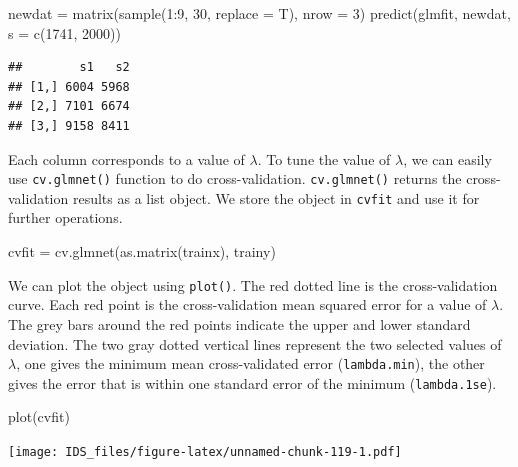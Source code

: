 \documentclass[
  12pt,
]{krantz}
\makeatletter
\newenvironment{Shaded}{\begin{snugshade}}{\end{snugshade}}
\newcommand{\AttributeTok}[1]{\textcolor[rgb]{0.61,0.61,0.61}{#1}}
\newcommand{\DecValTok}[1]{\textcolor[rgb]{0.06,0.06,0.06}{#1}}
\newcommand{\FunctionTok}[1]{\textcolor[rgb]{0,0,0}{#1}}
\newcommand{\NormalTok}[1]{#1}
\newcommand{\OtherTok}[1]{\textcolor[rgb]{0.37,0.37,0.37}{#1}}
\newcommand{\SpecialCharTok}[1]{\textcolor[rgb]{0,0,0}{#1}}
\newenvironment{kframe}{%
\medskip{}
\setlength{\fboxsep}{.8em}
 \def\at@end@of@kframe{}%
 \ifinner\ifhmode%
  \def\at@end@of@kframe{\end{minipage}}%
  \begin{minipage}{\columnwidth}%
 \fi\fi%
 \def\FrameCommand##1{\hskip\@totalleftmargin \hskip-\fboxsep
 \colorbox{shadecolor}{##1}\hskip-\fboxsep
     \hskip-\linewidth \hskip-\@totalleftmargin \hskip\columnwidth}%
 \MakeFramed {\advance\hsize-\width
   \@totalleftmargin\z@ \linewidth\hsize
   \@setminipage}}%
 {\par\unskip\endMakeFramed%
 \at@end@of@kframe}
\renewenvironment{Shaded}{\begin{kframe}}{\end{kframe}}
\makeatother
\begin{document}
\begin{Shaded}
\begin{Highlighting}[]
\NormalTok{newdat }\OtherTok{=} \FunctionTok{matrix}\NormalTok{(}\FunctionTok{sample}\NormalTok{(}\DecValTok{1}\SpecialCharTok{:}\DecValTok{9}\NormalTok{, }\DecValTok{30}\NormalTok{, }\AttributeTok{replace =}\NormalTok{ T), }\AttributeTok{nrow =} \DecValTok{3}\NormalTok{)}
\FunctionTok{predict}\NormalTok{(glmfit, newdat, }\AttributeTok{s =} \FunctionTok{c}\NormalTok{(}\DecValTok{1741}\NormalTok{, }\DecValTok{2000}\NormalTok{))}
\end{Highlighting}
\end{Shaded}

\begin{verbatim}
##        s1   s2
## [1,] 6004 5968
## [2,] 7101 6674
## [3,] 9158 8411
\end{verbatim}

Each column corresponds to a value of \(\lambda\). To tune the value of \(\lambda\), we can easily use \texttt{cv.glmnet()} function to do cross-validation. \texttt{cv.glmnet()} returns the cross-validation results as a list object. We store the object in \texttt{cvfit} and use it for further operations.

\begin{Shaded}
\begin{Highlighting}[]
\NormalTok{cvfit }\OtherTok{=} \FunctionTok{cv.glmnet}\NormalTok{(}\FunctionTok{as.matrix}\NormalTok{(trainx), trainy)}
\end{Highlighting}
\end{Shaded}

We can plot the object using \texttt{plot()}. The red dotted line is the cross-validation curve. Each red point is the cross-validation mean squared error for a value of \(\lambda\). The grey bars around the red points indicate the upper and lower standard deviation. The two gray dotted vertical lines represent the two selected values of \(\lambda\), one gives the minimum mean cross-validated error (\texttt{lambda.min}), the other gives the error that is within one standard error of the minimum (\texttt{lambda.1se}).

\begin{Shaded}
\begin{Highlighting}[]
\FunctionTok{plot}\NormalTok{(cvfit)}
\end{Highlighting}
\end{Shaded}

\texttt{[image: IDS\_files/figure-latex/unnamed-chunk-119-1.pdf]}
\end{document}
